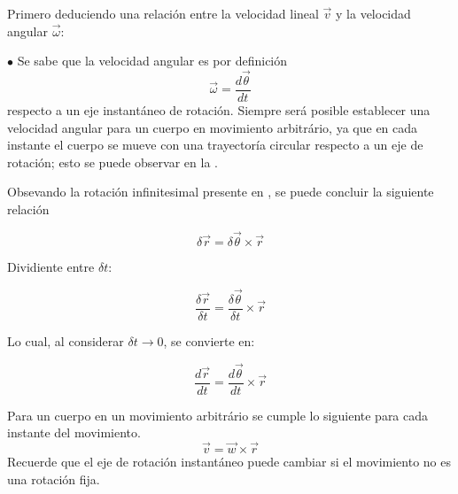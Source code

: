 \documentclass[/home/hernan/Documentos/Apuntes_mecanica_teorica/main.tex]{subfiles}
\begin{document}
	Primero deduciendo una relación entre la velocidad lineal $\vec{v}$ y la velocidad angular $\vec{\omega}$:

	$\bullet$ Se sabe que la velocidad angular es por definición
	\begin{equation}
		\vec{\omega}= \frac{d \vec{\theta}}{dt}
	\end{equation}
	respecto a un eje instantáneo de rotación. Siempre será posible establecer una velocidad angular para un cuerpo en movimiento arbitrário, ya que en cada instante el cuerpo se mueve con una trayectoría circular respecto a un eje de rotación; esto se puede observar en la .


	Obsevando la rotación infinitesimal presente en , se puede concluir la siguiente relación 
	

	\begin{equation*}
		\delta \vec{r} = \delta \vec{\theta} \times \vec{r}
	\end{equation*}

	Dividiente entre $\delta t$:

	\begin{equation*}
		\frac{\delta \vec{r}}{\delta t} =\frac{\delta \vec{\theta}}{\delta t}  \times \vec{r}
	\end{equation*}

	Lo cual, al considerar $\delta t \rightarrow 0$, se convierte en:

	\begin{equation*}
		\frac{d \vec{r}}{dt} = \frac{d \vec{\theta}}{dt} \times \vec{r}
	\end{equation*}

	\begin{definition}
		Para un cuerpo en un movimiento arbitrário se cumple lo siguiente para cada instante del movimiento.
		\begin{equation}
			\vec{v} = \vec{w} \times \vec{r}
			\label{eq: vwrelation}
		\end{equation}
		Recuerde que el eje de rotación instantáneo puede cambiar si el movimiento no es una rotación fija.
	\end{definition}
\end{document}
